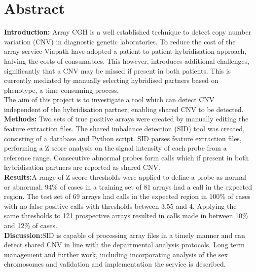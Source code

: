 \begingroup
\let\clearpage\relax
\let\cleardoublepage\relax
\let\cleardoublepage\relax

\chapter*{Abstract}
\textbf{Introduction:} Array CGH is a well established technique to detect copy number variation (CNV) in diagnostic genetic laboratories. To reduce the cost of the array service Viapath have adopted a patient to patient hybridisation approach, halving the costs of consumables. This however, introduces additional challenges, significantly that a CNV may be missed if present in both patients. This is currently mediated by manually selecting hybridised partners based on phenotype, a time consuming process.
\\ The aim of this project is to investigate a tool which can detect CNV independent of the hybridisation partner, enabling shared CNV to be detected.
\\ 
\textbf{Methods:} Two sets of true positive arrays were created by manually editing the feature extraction files. The shared imbalance detection (SID) tool was created, consisting of a database and Python script. SID parses feature extraction files, performing a Z score analysis on the signal intensity of each probe from a reference range. Consecutive abnormal probes form calls which if present in both hybridisation partners are reported as shared CNV.
\\
\textbf{Results:}A range of Z score thresholds were applied to define a probe as normal or abnormal. 94\% of cases in a training set of 81 arrays had a call in the expected region. The test set of 69 arrays had calls in the expected region in 100\% of cases with no false positive calls with thresholds between 3.55 and 4. Applying the same thresholds to 121 prospective arrays resulted in calls made in between 10\% and 12\% of cases.
\\
\textbf{Discussion:}SID is capable of processing array files in a timely manner and can detect shared CNV in line with the departmental analysis protocols. Long term management and further work, including incorporating analysis of the sex chromosomes and validation and implementation the service is described.

\vfill

\endgroup			

\vfill